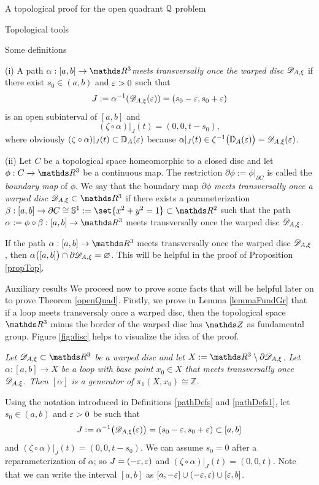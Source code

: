 \documentclass[11pt, a4paper, english, twoside, notitlepage, openright]{report}
\begin{document}
\begin{chapter}{A topological proof for the open quadrant $\mathcal{Q}$ problem}
\begin{section}{Topological tools}
\begin{subsection}{Some definitions}
\begin{definitions} \label{pathDefs1}

(i) A path $\alpha:[a,b]\to\R^3$\emph{meets transversally once the warped disc $\mathscr{D}_{A,\xi}$} if there exist $s_0\in(a,b)$ and $\varepsilon>0$ such that
$$
J:=\alpha^{-1}(\mathscr{D}_{A,\xi}(\varepsilon))=(s_0-\varepsilon,s_0+\varepsilon)
$$
is an open subinterval of $[a,b]$ and 
$$
(\zeta\circ\alpha)|_J(t)=(0,0,t-s_0),
$$
where obviously $(\zeta\circ\alpha)|_J(t)\subset\mathbb{D}_A(\varepsilon)$ because $\alpha|_J(t)\in\zeta^{-1}\big(\mathbb{D}_A(\varepsilon)\big) = \mathscr{D}_{A,\xi}(\varepsilon)$.

\vspace{1mm}

(ii) Let $C$ be a topological space homeomorphic to a closed disc and let $\phi:C\to\R^3$ be a continuous map. The restriction $\partial\phi:=\phi|_{\partial C}$ is called the \textit{boundary map} of $\phi$. We say that the boundary map $\partial\phi$ \emph{meets transversally once a warped disc} $\D_{A,\xi}\subset\R^3$ if there exists a parameterization $\beta:[a,b]\to\partial C\cong\mathbb{S}^1:=\set{x^2+y^2=1}\subset\R^2$ such that the path $\alpha:=\phi\circ\beta:[a,b]\to\R^3$ meets transversally once the warped disc $\mathscr{D}_{A,\xi}$.
\end{definitions}


\begin{remark}\label{remPath}
If the path $\alpha:[a,b]\to\R^3$ meets transversally once the warped disc $\mathscr{D}_{A,\xi}$, then $\alpha\big([a,b]\big)\cap\partial\mathscr{D}_{A,\xi}=\varnothing$. This will be helpful in the proof of Proposition \ref{propTop}.
\end{remark}
\end{subsection}

\begin{subsection}{Auxiliary results}
We proceed now to prove some facts that will be helpful later on to prove Theorem \ref{openQuad}. Firstly, we prove in Lemma \ref{lemmaFundGr} that if a loop meets transversaly once a warped disc, then the topological space $\R^3$ minus the border of the warped disc has $\Z$ as fundamental group. Figure \ref{fig:disc} helps to visualize the idea of the proof.

\begin{lemma}\label{lemmaFundGr} \em Let $\D_{A,\xi}\subset\R^3$ be a warped disc and let $X:=\R^3\setminus\partial\D_{A,\xi}$. Let $\alpha:[a,b]\to X$ be a loop with base point $x_0\in X$ that meets transversally once $\mathscr{D}_{A,\xi}$. Then $[\alpha]$ is a generator of $\pi_1(X,x_0)\cong{\mathbb Z}$. \em 
\begin{Proof} 
Using the notation introduced in Definitions \ref{pathDefs} and \ref{pathDefs1}, let $s_0\in(a,b)$ and $\varepsilon>0$ be such that 
$$
J:=\alpha^{-1}\big(\mathscr{D}_{A,\xi}(\varepsilon)\big)=(s_0-\varepsilon,s_0+\varepsilon)\subset[a,b]
$$ 
and $(\zeta\circ\alpha)|_J(t)=(0,0,t-s_0)$. We can assume $s_0=0$ after a reparameterization of $\alpha$; so $J=(-\varepsilon,\varepsilon)$ and $(\zeta\circ\alpha)|_J(t)=(0,0,t)$. Note that we can write the interval $[a,b]$ as $[a,-\varepsilon]\cup(-\varepsilon,\varepsilon)\cup[\varepsilon,b]$.


\end{Proof}
\end{lemma}
\end{subsection}
\end{section}
\end{chapter}
\end{document}
